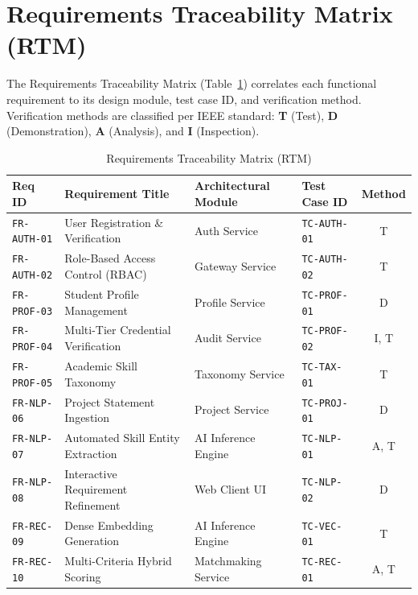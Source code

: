 \documentclass[11pt,a4paper]{article}
\begin{document}
\clearpage
\section{Requirements Traceability Matrix (RTM)}
\label{sec:traceability}

The Requirements Traceability Matrix (Table~\ref{tab:rtm}) correlates each functional requirement to its design module, test case ID, and verification method. Verification methods are classified per IEEE standard: \textbf{T} (Test), \textbf{D} (Demonstration), \textbf{A} (Analysis), and \textbf{I} (Inspection).

\begin{table}[H]
\centering
\small
\caption{Requirements Traceability Matrix (RTM)}
\label{tab:rtm}
\begin{tabularx}{\textwidth}{@{}l p{4.4cm} l l c@{}}
\toprule
\textbf{Req ID} & \textbf{Requirement Title} & \textbf{Architectural Module} & \textbf{Test Case ID} & \textbf{Method} \\
\midrule
\texttt{FR-AUTH-01} & User Registration \& Verification & Auth Service & \texttt{TC-AUTH-01} & T \\
\texttt{FR-AUTH-02} & Role-Based Access Control (RBAC) & Gateway Service & \texttt{TC-AUTH-02} & T \\
\texttt{FR-PROF-03} & Student Profile Management & Profile Service & \texttt{TC-PROF-01} & D \\
\texttt{FR-PROF-04} & Multi-Tier Credential Verification & Audit Service & \texttt{TC-PROF-02} & I, T \\
\texttt{FR-PROF-05} & Academic Skill Taxonomy & Taxonomy Service & \texttt{TC-TAX-01} & T \\
\texttt{FR-NLP-06}  & Project Statement Ingestion & Project Service & \texttt{TC-PROJ-01} & D \\
\texttt{FR-NLP-07}  & Automated Skill Entity Extraction & AI Inference Engine & \texttt{TC-NLP-01} & A, T \\
\texttt{FR-NLP-08}  & Interactive Requirement Refinement & Web Client UI & \texttt{TC-NLP-02} & D \\
\texttt{FR-REC-09}  & Dense Embedding Generation & AI Inference Engine & \texttt{TC-VEC-01} & T \\
\texttt{FR-REC-10}  & Multi-Criteria Hybrid Scoring & Matchmaking Service & \texttt{TC-REC-01} & A, T \\

\end{tabularx}
\end{table}
\end{document}
